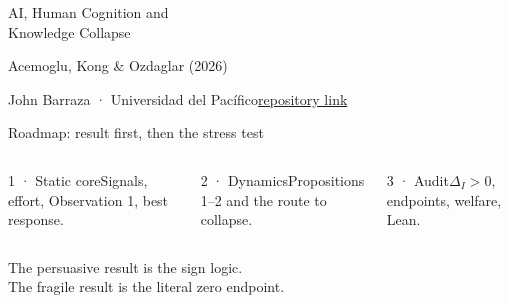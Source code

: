 \documentclass[aspectratio=169,10pt]{beamer}
\begin{document}
\begin{frame}[plain]
\par\vspace{.35cm}
{\color{AKONavy}AI, Human Cognition and\\Knowledge Collapse}\par\vspace{.35cm}
{\large Acemoglu, Kong \& Ozdaglar (2026)}\par\vspace{.65cm}
\vfill{\small John Barraza · Universidad del Pacífico}\hfill{\small\href{https://github.com/johnbarraza/ai-04-acemoglu}{repository link}}
\end{frame}

\begin{frame}{Roadmap: result first, then the stress test}
\begin{columns}[T,onlytextwidth]
\begin{block}{1 · Static core}Signals, effort, Observation 1, best response.\end{block}
\begin{block}{2 · Dynamics}Propositions 1--2 and the route to collapse.\end{block}
\begin{alertblock}{3 · Audit}$\Delta_I>0$, endpoints, welfare, Lean.\end{alertblock}
\end{columns}
\vspace{.55cm}\Large\centering The persuasive result is the sign logic.\\The fragile result is the literal zero endpoint.
\end{frame}
\end{document}
